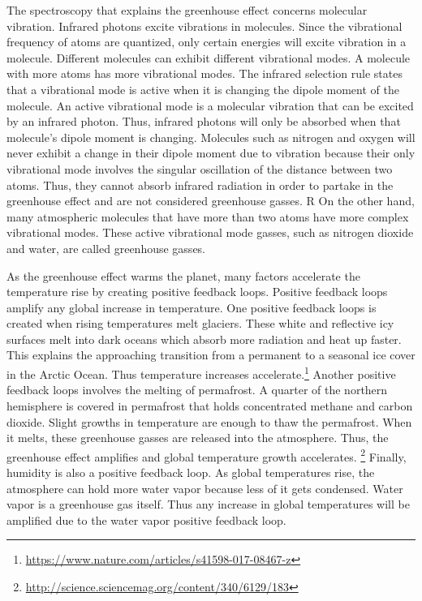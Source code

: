 \documentclass[12pt,]{article}
\let\rmarkdownfootnote\footnote%
\def\footnote{\protect\rmarkdownfootnote}
\begin{document}
The spectroscopy that explains the greenhouse effect concerns molecular
vibration. Infrared photons excite vibrations in molecules. Since the
vibrational frequency of atoms are quantized, only certain energies will
excite vibration in a molecule. Different molecules can exhibit
different vibrational modes. A molecule with more atoms has more
vibrational modes. The infrared selection rule states that a vibrational
mode is active when it is changing the dipole moment of the molecule. An
active vibrational mode is a molecular vibration that can be excited by
an infrared photon. Thus, infrared photons will only be absorbed when
that molecule's dipole moment is changing. Molecules such as nitrogen
and oxygen will never exhibit a change in their dipole moment due to
vibration because their only vibrational mode involves the singular
oscillation of the distance between two atoms. Thus, they cannot absorb
infrared radiation in order to partake in the greenhouse effect and are
not considered greenhouse gasses. R On the other hand, many atmospheric
molecules that have more than two atoms have more complex vibrational
modes. These active vibrational mode gasses, such as nitrogen dioxide
and water, are called greenhouse gasses.

As the greenhouse effect warms the planet, many factors accelerate the
temperature rise by creating positive feedback loops. Positive feedback
loops amplify any global increase in temperature. One positive feedback
loops is created when rising temperatures melt glaciers. These white and
reflective icy surfaces melt into dark oceans which absorb more
radiation and heat up faster. This explains the approaching transition
from a permanent to a seasonal ice cover in the Arctic Ocean. Thus
temperature increases accelerate.\footnote{\url{https://www.nature.com/articles/s41598-017-08467-z}}
Another positive feedback loops involves the melting of permafrost. A
quarter of the northern hemisphere is covered in permafrost that holds
concentrated methane and carbon dioxide. Slight growths in temperature
are enough to thaw the permafrost. When it melts, these greenhouse
gasses are released into the atmosphere. Thus, the greenhouse effect
amplifies and global temperature growth accelerates. \footnote{\url{http://science.sciencemag.org/content/340/6129/183}}
Finally, humidity is also a positive feedback loop. As global
temperatures rise, the atmosphere can hold more water vapor because less
of it gets condensed. Water vapor is a greenhouse gas itself. Thus any
increase in global temperatures will be amplified due to the water vapor
positive feedback loop.
\end{document}

